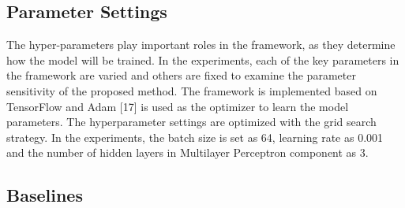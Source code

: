 \subsection{Parameter Settings}

The hyper-parameters play important roles in the framework, as they determine how the model will be
trained. In the experiments, each of the key parameters
in the framework are varied and others are fixed to examine the parameter sensitivity
of the proposed method. The framework is implemented based
on TensorFlow and Adam [17] is used as the optimizer to learn the
model parameters. The hyperparameter settings are optimized with
the grid search strategy. In the experiments, the batch size is set
as 64, learning rate as 0.001 \newpage \noindent and the number of hidden layers in
Multilayer Perceptron component as 3.

\subsection{Baselines}

